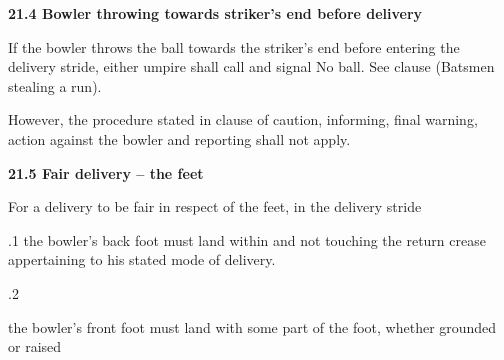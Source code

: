 \documentclass[12pt]{article}
\begin{document}
\vspace{\baselineskip}
{\fontsize{11pt}{13.2pt}\selectfont \textbf{21.4 \tabto{0.47in} Bowler throwing towards striker’s end before delivery}\par}\par


\vspace{\baselineskip}
\begin{adjustwidth}{0.0in}{0.14in}
{\fontsize{9pt}{10.8pt}\selectfont If the bowler throws the ball towards the striker’s end before entering the delivery stride, either umpire shall call and signal No ball. See clause (Batsmen stealing a run).\par}\par

\end{adjustwidth}


\vspace{\baselineskip}
\begin{adjustwidth}{0.0in}{0.36in}
{\fontsize{9pt}{10.8pt}\selectfont However, the procedure stated in clause of caution, informing, final warning, action against the bowler and reporting shall not apply.\par}\par

\end{adjustwidth}


\vspace{\baselineskip}
{\fontsize{11pt}{13.2pt}\selectfont \textbf{21.5 \tabto{0.47in} Fair delivery – the feet}\par}\par


\vspace{\baselineskip}
{\fontsize{9pt}{10.8pt}\selectfont For a delivery to be fair in respect of the feet, in the delivery stride\par}\par


\vspace{\baselineskip}
\begin{adjustwidth}{0.5in}{0.0in}
{\fontsize{9pt}{10.8pt}.1 \tabto{0.49in} the bowler’s back foot must land within and not touching the return crease appertaining to his stated mode of delivery.\par}\par

\end{adjustwidth}


\vspace{\baselineskip}
{\fontsize{9pt}{10.8pt}.2 \tabto{0.49in} {\fontsize{8pt}{9.6pt}\selectfont the bowler’s front foot must land with some part of the foot, whether grounded or raised\par}\par}\par
\end{document}
